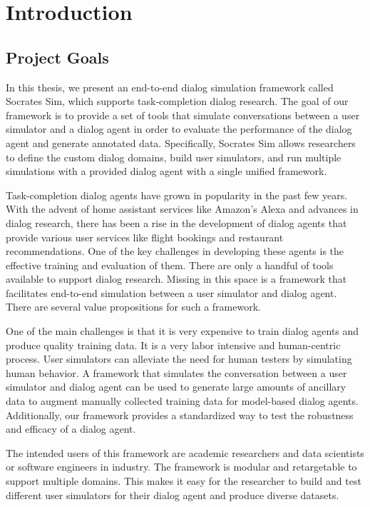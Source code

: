 \chapter{Introduction}

\section{Project Goals}

In this thesis, we present an end-to-end dialog simulation framework called Socrates Sim, which supports task-completion dialog research. The goal of our framework is to provide a set of tools that simulate conversations between a user simulator and a dialog agent in order to evaluate the performance of the dialog agent and generate annotated data. Specifically, Socrates Sim allows researchers to define the custom dialog domains, build user simulators, and run multiple simulations with a provided dialog agent with a single unified framework. 

Task-completion dialog agents have grown in popularity in the past few years. With the advent of home assistant services like Amazon's Alexa and advances in dialog research, there has been a rise in the development of dialog agents that provide various user services like flight bookings and restaurant recommendations. One of the key challenges in developing these agents is the effective training and evaluation of them. There are only a handful of tools available to support dialog research. Missing in this space is a framework that facilitates end-to-end simulation between a user simulator and dialog agent. There are several value propositions for such a framework.

One of the main challenges is that it is very expensive to train dialog agents and produce quality training data. It is a very labor intensive and human-centric process. User simulators can alleviate the need for human testers by simulating human behavior. A framework that simulates the conversation between a user simulator and dialog agent can be used to generate large amounts of ancillary data to augment manually collected training data for model-based dialog agents. Additionally, our framework provides a standardized way to test the robustness and efficacy of a dialog agent.

The intended users of this framework are academic researchers and data scientists or software engineers in industry. The framework is modular and retargetable to support multiple domains. This makes it easy for the researcher to build and test different user simulators for their dialog agent and produce diverse datasets. 

